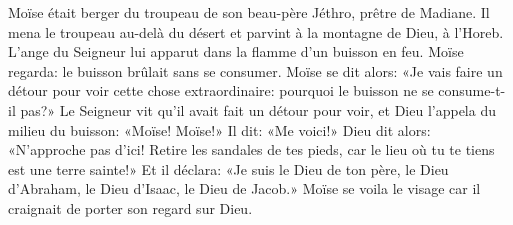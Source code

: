 Moïse était berger du troupeau de son beau-père Jéthro, prêtre de Madiane.
Il mena le troupeau au-delà du désert et parvint à la montagne de Dieu, à l’Horeb.
L’ange du Seigneur lui apparut dans la flamme d’un buisson en feu.
	Moïse regarda: le buisson brûlait sans se consumer.
Moïse se dit alors:
	«Je vais faire un détour pour voir cette chose extraordinaire:
	pourquoi le buisson ne se consume-t-il pas?»
Le Seigneur vit qu’il avait fait un détour pour voir,
	et Dieu l’appela du milieu du buisson: «Moïse! Moïse!»
	Il dit: «Me voici!»
Dieu dit alors: «N’approche pas d’ici!
	Retire les sandales de tes pieds, car le lieu où tu te tiens est une terre sainte!»
Et il déclara: «Je suis le Dieu de ton père,
	le Dieu d’Abraham, le Dieu d’Isaac, le Dieu de Jacob.»
Moïse se voila le visage car il craignait de porter son regard sur Dieu.
